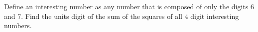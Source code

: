 Define an interesting number as any number that is composed of only the digits $6$ and $7$. Find the units digit of the sum of the squares of all $4$ digit interesting numbers.
